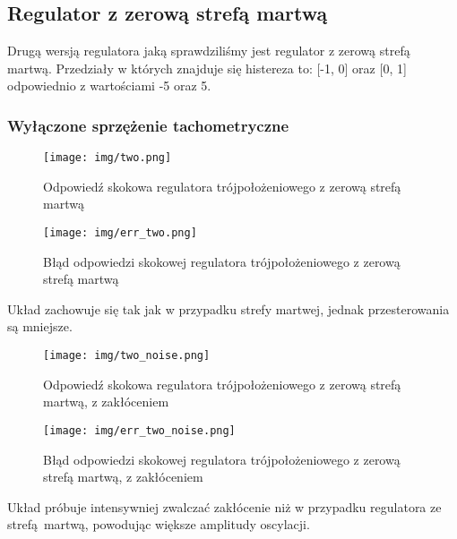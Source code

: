 \documentclass[a4paper, 12pt, titlepage]{article}
\begin{document}
		\subsection{Regulator z zerową strefą martwą}
			Drugą wersją regulatora jaką sprawdziliśmy jest regulator z zerową strefą martwą. Przedziały w których znajduje się histereza to: [-1, 0] oraz [0, 1] odpowiednio z wartościami -5 oraz 5.
			\subsubsection{Wyłączone sprzężenie tachometryczne}
				\begin{figure}[H]
					\centering
					\texttt{[image: img/two.png]}
					\caption{Odpowiedź skokowa regulatora trójpołożeniowego z zerową strefą martwą}
				\end{figure}
				\begin{figure}[H]
					\centering
					\texttt{[image: img/err\_two.png]}
					\caption{Błąd odpowiedzi skokowej regulatora trójpołożeniowego z zerową strefą martwą}
				\end{figure}
				Układ zachowuje się tak jak w przypadku strefy martwej, jednak przesterowania są mniejsze.
				\begin{figure}[H]
					\centering
					\texttt{[image: img/two\_noise.png]}
					\caption{Odpowiedź skokowa regulatora trójpołożeniowego z zerową strefą martwą, z zakłóceniem}
				\end{figure}
				\begin{figure}[H]
					\centering
					\texttt{[image: img/err\_two\_noise.png]}
					\caption{Błąd odpowiedzi skokowej regulatora trójpołożeniowego z zerową strefą martwą, z zakłóceniem}
				\end{figure} \noindent
				Układ próbuje intensywniej zwalczać zakłócenie niż w przypadku regulatora ze strefą martwą, powodując większe amplitudy oscylacji.
\end{document}
